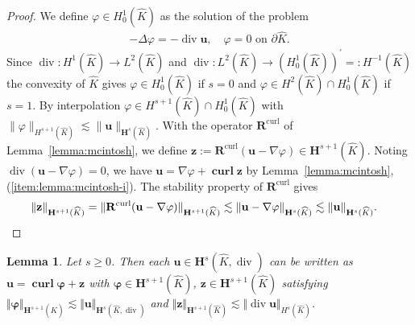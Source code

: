 \documentclass{article}
\newtheorem{lemma}[theorem]{Lemma}
\begin{document}
\begin{proof} 
We define $\varphi\in H^{1}_0(\widehat{K})$ as the solution of the problem
\begin{align*}
-\Delta\varphi=-\operatorname{div}\mathbf{u}, \quad \varphi=0 \text{ on }\partial\widehat{K}.
\end{align*}
Since $\operatorname{div}:H^1(\widehat{K}) \rightarrow L^2(\widehat{K})$ and 
$\operatorname{div}:L^2(\widehat{K}) \rightarrow (H^1_0(\widehat{K}))^\prime =: H^{-1}(\widehat{K})$
the convexity of $\widehat{K}$ gives 
$\varphi \in H^1_0(\widehat{K})$ if $s = 0$ and 
$\varphi \in H^2(\widehat{K}) \cap H^1_0(\widehat{K})$ if $s = 1$. By interpolation 
$\varphi \in H^{s+1}(\widehat{K}) \cap H^1_0(\widehat{K})$ with 
$\|\varphi \|_{H^{s+1}(\widehat{K})} \lesssim \|{\mathbf u}\|_{{\mathbf H}^s(\widehat K)}$. 
With the operator $\mathbf{R}^{\operatorname{curl}}$ of Lemma~\ref{lemma:mcintosh}, we define $\mathbf{z}:=\mathbf{R}^{\operatorname{curl}}(\mathbf{u}-\nabla\varphi)\in\mathbf{H}^{s+1}(\widehat{K})$. 
Noting $\operatorname{div}(\mathbf{u}-\nabla\varphi)=0$, 
we have ${\mathbf u} = \nabla \varphi+ \operatorname{\mathbf{curl}} {\mathbf z}$ 
by Lemma~\ref{lemma:mcintosh}, (\ref{item:lemma:mcintosh-i}). The stability property of $\mathbf{R}^{\operatorname{curl}}$ gives
\begin{align*}
&\|\mathbf{z}\|_{\mathbf{H}^{s+1}(\widehat{K})} = \|\mathbf{R}^{\operatorname{curl}}(\mathbf{u}-\nabla\varphi)\|_{\mathbf{H}^{s+1}(\widehat{K})} \lesssim \|\mathbf{u}-\nabla\varphi\|_{\mathbf{H}^s(\widehat{K})} \lesssim \|\mathbf{u}\|_{\mathbf{H}^s(\widehat{K})}.
\qedhere
\end{align*}
\end{proof}
\begin{lemma}
\label{lemma:helmholtz-decomposition-div}
Let $s \geq 0$. Then each ${\mathbf{u}}
\in{\mathbf{H}}^{s}(\widehat{K},\operatorname*{div})$ can be written as
${\mathbf{u}} = \operatorname*{\mathbf{curl}} \boldsymbol{\varphi}+ {\mathbf{z}}$ with $\boldsymbol{\varphi}\in \mathbf{H}^{s+1}%
(\widehat{K})$, ${\mathbf{z}} \in{\mathbf{H}}^{s+1}(\widehat{K})$ satisfying $\Vert\boldsymbol{\varphi}\Vert_{\mathbf{H}^{s+1}(\widehat{K})} \lesssim \Vert\mathbf{u}\Vert_{\mathbf{H}^s(\widehat{K},\operatorname*{div})}$ and $\Vert\mathbf{z}\Vert_{\mathbf{H}^{s+1}(\widehat{K})} \lesssim \Vert\operatorname*{div}\mathbf{u}\Vert_{H^s(\widehat{K})}$.
\end{lemma}
\end{document}

